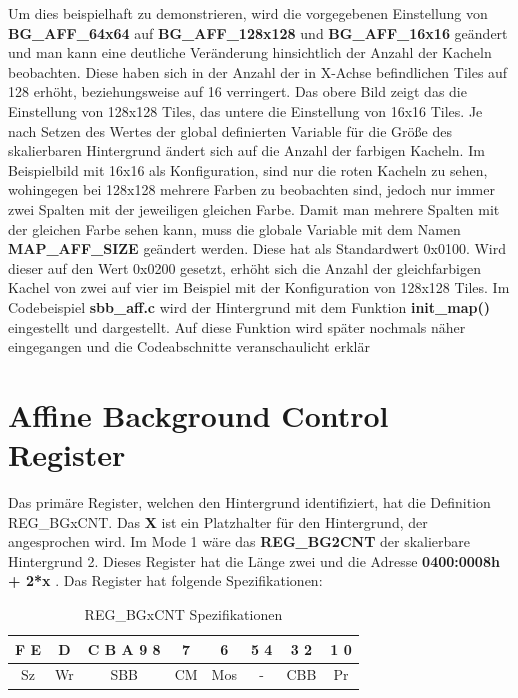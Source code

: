 Um dies beispielhaft zu demonstrieren, wird die vorgegebenen Einstellung von \textbf{BG\_AFF\_64x64} auf \textbf{BG\_AFF\_128x128} und \textbf{BG\_AFF\_16x16 }geändert und man kann eine deutliche Veränderung hinsichtlich der Anzahl der Kacheln beobachten. Diese haben sich in der Anzahl der in X-Achse befindlichen Tiles auf 128 erhöht, beziehungsweise auf 16 verringert. Das obere Bild zeigt das die Einstellung von 128x128 Tiles, das untere die Einstellung von 16x16 Tiles. Je nach Setzen des Wertes der global definierten Variable für die Größe des skalierbaren Hintergrund ändert sich auf die Anzahl der farbigen Kacheln. Im Beispielbild mit 16x16 als Konfiguration, sind nur die roten Kacheln zu sehen, wohingegen bei 128x128 mehrere Farben zu beobachten sind, jedoch nur immer zwei Spalten mit der jeweiligen gleichen Farbe. Damit man mehrere Spalten mit der gleichen Farbe sehen kann, muss die globale Variable mit dem Namen \textbf{MAP\_AFF\_SIZE} geändert werden. Diese hat als Standardwert 0x0100. Wird dieser auf den Wert 0x0200 gesetzt, erhöht sich die Anzahl der gleichfarbigen Kachel von zwei auf vier im Beispiel mit der Konfiguration von 128x128 Tiles. Im Codebeispiel \textbf{sbb\_aff.c} wird der Hintergrund mit dem Funktion \textbf{init\_map()} eingestellt und dargestellt. Auf diese Funktion wird später nochmals näher eingegangen und die Codeabschnitte veranschaulicht erklär

\section{Affine Background Control Register}
Das primäre Register, welchen den Hintergrund identifiziert, hat die Definition REG\_BGxCNT. Das \textbf{X} ist ein Platzhalter für den Hintergrund, der angesprochen wird. Im Mode 1 wäre das \textbf{REG\_BG2CNT} der skalierbare Hintergrund 2. Dieses Register hat die Länge zwei und die Adresse \textbf{ 0400:0008h + 2*x} . Das Register hat folgende Spezifikationen:
\begin{table}[ht]
\centering
\begin{tabular}{|c|c|c|c|c|c|c|c|}
\hline
\textbf{F E} & \textbf{D} & \textbf{C B A 9 8} & \textbf{7} & \textbf{6} & \textbf{5 4} & \textbf{3 2} & \textbf{1 0} \\ \hline
Sz & Wr & SBB & CM & Mos & - & CBB & Pr \\ \hline
\end{tabular}
\caption{REG\_BGxCNT Spezifikationen}
\label{regspec}
\end{table}

